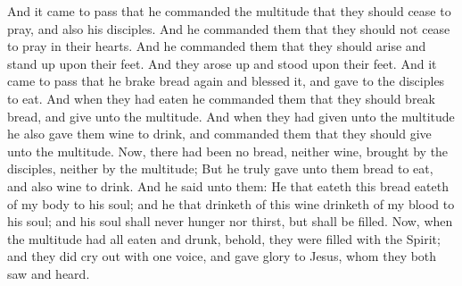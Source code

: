 \bchapter
\bverse \iffalse And it came to pass that he commanded the multitude that they should cease to pray, and also his disciples. And he commanded them that they should not cease to pray in their hearts. \fi
And it came to pass that he commanded the multitude that they should cease to pray, and also his disciples. And he commanded them that they should not cease to pray in their hearts.
\bverse \iffalse And he commanded them that they should arise and stand up upon their feet. And they arose up and stood upon their feet. \fi
And he commanded them that they should arise and stand up upon their feet. And they arose up and stood upon their feet.
\bverse \iffalse And it came to pass that he brake bread again and blessed it, and gave to the disciples to eat. \fi
And it came to pass that he brake bread again and blessed it, and gave to the disciples to eat.
\bverse \iffalse And when they had eaten he commanded them that they should break bread, and give unto the multitude. \fi
And when they had eaten he commanded them that they should break bread, and give unto the multitude.
\bverse \iffalse And when they had given unto the multitude he also gave them wine to drink, and commanded them that they should give unto the multitude. \fi
And when they had given unto the multitude he also gave them wine to drink, and commanded them that they should give unto the multitude.
\bverse \iffalse Now, there had been no bread, neither wine, brought by the disciples, neither by the multitude; \fi
Now, there had been no bread, neither wine, brought by the disciples, neither by the multitude;
\bverse \iffalse But he truly gave unto them bread to eat, and also wine to drink. \fi
But he truly gave unto them bread to eat, and also wine to drink.
\bverse \iffalse And he said unto them: He that eateth this bread eateth of my body to his soul; and he that drinketh of this wine drinketh of my blood to his soul; and his soul shall never hunger nor thirst, but shall be filled. \fi
And he said unto them: He that eateth this bread eateth of my body to his soul; and he that drinketh of this wine drinketh of my blood to his soul; and his soul shall never hunger nor thirst, but shall be filled.
\bverse \iffalse Now, when the multitude had all eaten and drunk, behold, they were filled with the Spirit; and they did cry out with one voice, and gave glory to Jesus, whom they both saw and heard. \fi
Now, when the multitude had all eaten and drunk, behold, they were filled with the Spirit; and they did cry out with one voice, and gave glory to Jesus, whom they both saw and heard.
